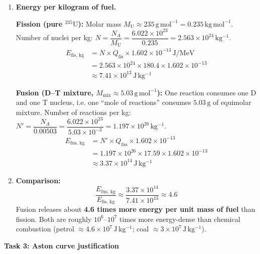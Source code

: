\documentclass[11pt]{article}
\begin{document}
\begin{enumerate}
    \item \textbf{Energy per kilogram of fuel.}

    \textbf{Fission (pure $^{235}\mathrm{U}$):}
    Molar mass $M_{\mathrm{U}} \approx 235\,\mathrm{g\,mol^{-1}} = 0.235\,\mathrm{kg\,mol^{-1}}$.
    Number of nuclei per kg: $N = \dfrac{N_A}{M_{\mathrm{U}}} = \dfrac{6.022 \times 10^{23}}{0.235} = 2.563 \times 10^{24}\,\mathrm{kg^{-1}}$.
    \begin{align*}
        E_{\text{fis, kg}} &= N \times Q_{\text{fis}} \times 1.602 \times 10^{-13}\,\mathrm{J/MeV} \\
        &= 2.563 \times 10^{24} \times 180.4 \times 1.602 \times 10^{-13} \\
        &\approx \boxed{7.41 \times 10^{13}\,\mathrm{J\,kg^{-1}}}
    \end{align*}

    \textbf{Fusion (D--T mixture, $M_{\text{mix}} \approx 5.03\,\mathrm{g\,mol^{-1}}$):}
    One reaction consumes one D and one T nucleus, i.e. one ``mole of reactions'' consumes $5.03\,\mathrm{g}$ of equimolar mixture.
    Number of reactions per kg: $N' = \dfrac{N_A}{0.00503} = \dfrac{6.022 \times 10^{23}}{5.03 \times 10^{-3}} = 1.197 \times 10^{26}\,\mathrm{kg^{-1}}$.
    \begin{align*}
        E_{\text{fus, kg}} &= N' \times Q_{\text{fus}} \times 1.602 \times 10^{-13} \\
        &= 1.197 \times 10^{26} \times 17.59 \times 1.602 \times 10^{-13} \\
        &\approx \boxed{3.37 \times 10^{14}\,\mathrm{J\,kg^{-1}}}
    \end{align*}

    \item \textbf{Comparison:}
    \[
    \frac{E_{\text{fus, kg}}}{E_{\text{fis, kg}}} \approx \frac{3.37 \times 10^{14}}{7.41 \times 10^{13}} \approx 4.6
    \]
    Fusion releases about \textbf{4.6 times more energy per unit mass of fuel} than fission. Both are roughly $10^6$--$10^7$ times more energy-dense than chemical combustion (petrol $\approx 4.6 \times 10^{7}\,\mathrm{J\,kg^{-1}}$; coal $\approx 3 \times 10^{7}\,\mathrm{J\,kg^{-1}}$).
\end{enumerate}

\textbf{Task 3: Aston curve justification}
\end{document}
